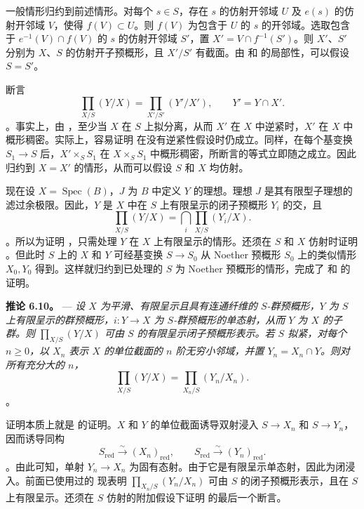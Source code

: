 一般情形归约到前述情形。对每个 \(s\in S\)，存在 \(s\) 的仿射开邻域 \(U\) 及 \(e(s)\) 的仿射开邻域 \(V\)，使得 \(f(V)\subset U\)。则 \(f(V)\) 为包含于 \(U\) 的 \(s\) 的开邻域。选取包含于 \(e^{-1}(V)\cap f(V)\) 的 \(s\) 的仿射开邻域 \(S'\)，置 \(X'=V\cap f^{-1}(S')\)。则 \(X'\)、\(S'\) 分别为 \(X\)、\(S\) 的仿射开子预概形，且 \(X'/S'\) 有截面。由  和  的局部性，可以假设 \(S=S'\)。

断言  \[
  \prod_{X/S}(Y/X)=\prod_{X'/S'}(Y'/X'),
  \qquad Y'=Y\cap X'.
\]。事实上，由 ，至少当 \(X\) 在 \(S\) 上拟分离，从而 \(X'\) 在 \(X\) 中逆紧时，\(X'\) 在 \(X\) 中概形稠密。实际上，容易证明  在没有逆紧性假设时仍成立。同样，在每个基变换 \(S_1\to S\) 后，\(X'\times_SS_1\) 在 \(X\times_SS_1\) 中概形稠密，所断言的等式立即随之成立。因此归约到 \(X=X'\) 的情形，从而可以假设 \(S\) 和 \(X\) 均仿射。

现在设 \(X=\operatorname{Spec}(B)\)，\(J\) 为 \(B\) 中定义 \(Y\) 的理想。理想 \(J\) 是其有限型子理想的滤过余极限。因此，\(Y\) 是 \(X\) 中在 \(S\) 上有限呈示的闭子预概形 \(Y_i\) 的交，且  \[
  \prod_{X/S}(Y/X)
  =
  \bigcap_i\prod_{X/S}(Y_i/X).
\]。所以为证明 ，只需处理 \(Y\) 在 \(X\) 上有限呈示的情形。还须在 \(S\) 和 \(X\) 仿射时证明 。但此时 \(S\) 上的 \(X\) 和 \(Y\) 可经基变换 \(S\to S_0\) 从 Noether 预概形 \(S_0\) 上的类似情形 \(X_0,Y_0\) 得到。这样就归约到已处理的 \(S\) 为 Noether 预概形的情形，完成了  和  的证明。

\medskip\noindent{}\textbf{推论 6.10。} --- \textit{设 \(X\) 为平滑、有限呈示且具有连通纤维的 \(S\)-群预概形，\(Y\) 为 \(S\) 上有限呈示的群预概形，\(i:Y\to X\) 为 \(S\)-群预概形的单态射，从而 \(Y\) 为 \(X\) 的子群。则 \(\prod_{X/S}(Y/X)\) 可由 \(S\) 的有限呈示闭子预概形表示。若 \(S\) 拟紧，对每个 \(n\geq0\)，以 \(X_n\) 表示 \(X\) 的单位截面的 \(n\) 阶无穷小邻域，并置 \(Y_n=X_n\cap Y\)。则对所有充分大的 \(n\)，}  \[
  \prod_{X/S}(Y/X)=\prod_{X_n/S}(Y_n/X_n).
\]。

证明本质上就是  的证明。\(X\) 和 \(Y\) 的单位截面诱导双射浸入 \(S\to X_n\) 和 \(S\to Y_n\)，因而诱导同构  \[
  S_{\mathrm{red}}\xrightarrow{\sim}(X_n)_{\mathrm{red}},
  \qquad
  S_{\mathrm{red}}\xrightarrow{\sim}(Y_n)_{\mathrm{red}}.
\]。由此可知，单射 \(Y_n\to X_n\) 为固有态射。由于它是有限呈示单态射，因此为闭浸入。前面已使用过的  现表明 \(\prod_{X_n/S}(Y_n/X_n)\) 可由 \(S\) 的闭子预概形表示，且在 \(S\) 上有限呈示。还须在 \(S\) 仿射的附加假设下证明  的最后一个断言。

